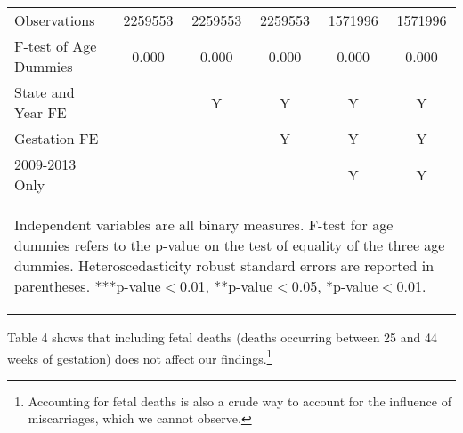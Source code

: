 \documentclass[a4paper, 12 pt]{article}
\theoremstyle{plain}
\begin{document}
\begin{doublespace}
\begin{table}[htbp]
\begin{tabular}{l*{5}{c}}
\midrule
Observations        &     2259553   &     2259553   &     2259553   &     1571996   &     1571996   \\
F-test of Age Dummies&0.000&0.000 &0.000&0.000&0.000 \\
State and Year FE  &                &    Y          &                          Y  &      Y  &    Y\\ Gestation FE & &&Y&Y&Y\\
2009-2013 Only& &&&Y&Y\\ \bottomrule
\multicolumn{6}{p{15cm}}{\begin{footnotesize} Independent
variables are all binary
measures. F-test for age dummies refers to the p-value on the
test of equality of the three age dummies. Heteroscedasticity
robust standard errors are reported in parentheses.
***p-value$<$0.01, **p-value$<$0.05, *p-value$<$0.01.
\end{footnotesize}}\end{tabular}\end{table}

\vspace{10mm}
\vspace{10mm}

Table 4 shows that including fetal deaths (deaths occurring between 25 and 44 weeks of gestation) does not affect our findings.\footnote{ Accounting for fetal deaths is also a crude way to account for the influence of miscarriages, which we cannot observe.}


\end{doublespace}
\end{document}
